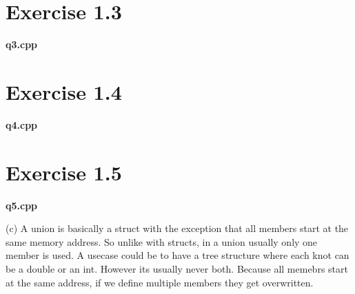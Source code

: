 \documentclass{article} %
\newcommand{\homeworkNumber}{1} %
\begin{document}
\section*{Exercise \homeworkNumber.3}
\textbf{q3.cpp}
\lstset{language=C++}

\clearpage

\section*{Exercise \homeworkNumber.4}
\textbf{q4.cpp}
\lstset{language=C++}

\clearpage

\section*{Exercise \homeworkNumber.5}
\textbf{q5.cpp}
\lstset{language=C++}

(c) A union is basically a struct with the exception that all members start at the same memory address. So unlike with structs, in a union usually only one member is used.
A usecase could be to have a tree structure where each knot can be a double or an int. However its usually never both.
Because all memebrs start at the same address, if we define multiple members they get overwritten.
\clearpage

\end{document}
